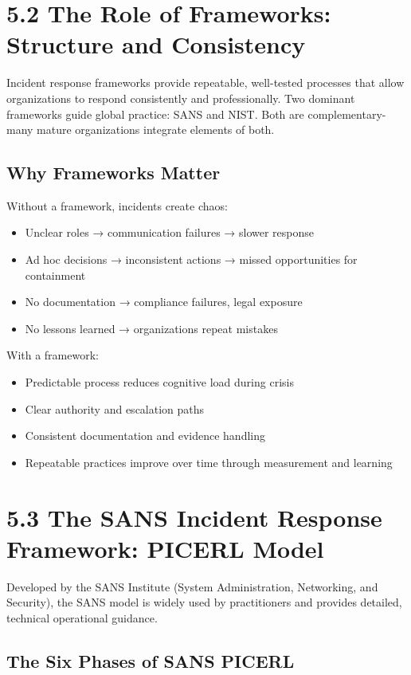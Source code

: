 \documentclass[10pt]{article}
\begin{document}
\section*{5.2 The Role of Frameworks: Structure and Consistency}
Incident response frameworks provide repeatable, well-tested processes that allow organizations to respond consistently and professionally. Two dominant frameworks guide global practice: SANS and NIST. Both are complementary-many mature organizations integrate elements of both.

\subsection*{Why Frameworks Matter}
Without a framework, incidents create chaos:

\begin{itemize}
  \item Unclear roles → communication failures → slower response
  \item Ad hoc decisions → inconsistent actions → missed opportunities for containment
  \item No documentation → compliance failures, legal exposure
  \item No lessons learned → organizations repeat mistakes
\end{itemize}
With a framework:
\begin{itemize}
  \item Predictable process reduces cognitive load during crisis
  \item Clear authority and escalation paths
  \item Consistent documentation and evidence handling
  \item Repeatable practices improve over time through measurement and learning
\end{itemize}

\section*{5.3 The SANS Incident Response Framework: PICERL Model}
Developed by the SANS Institute (System Administration, Networking, and Security), the SANS model is widely used by practitioners and provides detailed, technical operational guidance.

\subsection*{The Six Phases of SANS PICERL}
\end{document}
